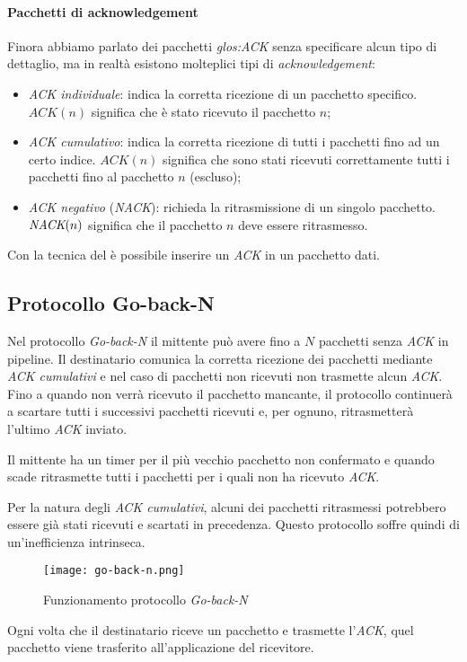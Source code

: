 \paragraph{Pacchetti di acknowledgement}
Finora abbiamo parlato dei pacchetti \emph{\gls{glos:ACK}} senza specificare
alcun tipo di dettaglio, ma in realtà esistono molteplici tipi di
\emph{acknowledgement}:
\begin{itemize}
    \item \emph{ACK individuale}: indica la corretta ricezione di un pacchetto
    specifico. $ACK(n)$ significa che è stato ricevuto il pacchetto $n$;
    \item \emph{ACK cumulativo}: indica la corretta ricezione di tutti i
    pacchetti fino ad un certo indice. $ACK(n)$ significa che sono stati
    ricevuti correttamente tutti i pacchetti fino al pacchetto $n$ (escluso);
    \item \emph{ACK negativo} (\emph{NACK}): richieda la ritrasmissione di un
    singolo pacchetto. $\emph{NACK}(n)$ significa che il pacchetto $n$ deve
    essere ritrasmesso.
\end{itemize}
Con la tecnica del  è possibile inserire un
\emph{ACK} in un pacchetto dati.

\subsection{Protocollo Go-back-N}
Nel protocollo \emph{Go-back-N} il mittente può avere fino a $N$ pacchetti
senza \emph{ACK} in pipeline. Il destinatario comunica la corretta ricezione dei
pacchetti mediante \emph{ACK cumulativi} e nel caso di pacchetti non ricevuti non
trasmette alcun \emph{ACK}. Fino a quando non verrà ricevuto il pacchetto mancante,
il protocollo continuerà a scartare tutti i successivi pacchetti ricevuti e, per
ognuno, ritrasmetterà l'ultimo \emph{ACK} inviato.

Il mittente ha un timer per il più vecchio pacchetto non confermato e quando
scade ritrasmette tutti i pacchetti per i quali non ha ricevuto \emph{ACK}.

Per la natura degli \emph{ACK cumulativi}, alcuni dei pacchetti ritrasmessi
potrebbero essere già stati ricevuti e scartati in precedenza. Questo protocollo
soffre quindi di un'inefficienza intrinseca.

\begin{figure}[h!]
    \centering
    \texttt{[image: go-back-n.png]}
    \caption{Funzionamento protocollo \emph{Go-back-N}}
\end{figure}\noindent
Ogni volta che il destinatario riceve un pacchetto e trasmette l'\emph{ACK},
quel pacchetto viene trasferito all'applicazione del ricevitore.

